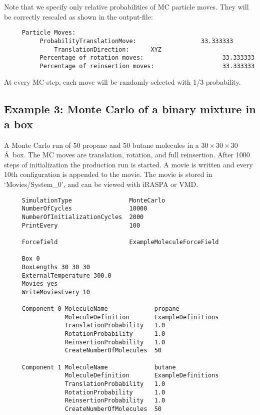 Note that we specify only relative probabilities of MC particle moves. They will be correctly rescaled as shown in the output-file:
\begin{tiny}
\begin{verbatim}
     Particle Moves:
          ProbabilityTranslationMove:                  33.333333
              TranslationDirection:      XYZ
          Percentage of rotation moves:                      33.333333
          Percentage of reinsertion moves:                   33.333333
\end{verbatim}
\end{tiny}
At every MC-step, each move will be randomly selected with 1/3 probability.


\subsection*{Example 3: Monte Carlo of a binary mixture in a box}
A Monte Carlo run of 50 propane and 50 butane molecules in a $30\times30\times30$ \AA\ box. The MC moves are
translation, rotation, and full reinsertion.
After 1000 steps of initialization the production run is started.
A movie is written and every 10th configuration is appended to the movie.
The movie is stored in `Movies/System\_0',
and can be viewed with iRASPA or VMD.

\begin{tiny}
\begin{verbatim}
     SimulationType                MonteCarlo
     NumberOfCycles                10000
     NumberOfInitializationCycles  2000
     PrintEvery                    100

     Forcefield                    ExampleMoleculeForceField

     Box 0
     BoxLengths 30 30 30
     ExternalTemperature 300.0
     Movies yes
     WriteMoviesEvery 10

     Component 0 MoleculeName             propane
                 MoleculeDefinition       ExampleDefinitions
                 TranslationProbability   1.0
                 RotationProbability      1.0
                 ReinsertionProbability   1.0
                 CreateNumberOfMolecules  50

     Component 1 MoleculeName             butane
                 MoleculeDefinition       ExampleDefinitions
                 TranslationProbability   1.0
                 RotationProbability      1.0
                 ReinsertionProbability   1.0
                 CreateNumberOfMolecules  50
\end{verbatim}
\end{tiny}

